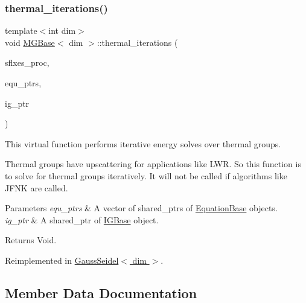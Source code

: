 \subsubsection{\texorpdfstring{thermal\+\_\+iterations()}{thermal\_iterations()}}
{\footnotesize\ttfamily template$<$int dim$>$ \\
void \hyperlink{class_m_g_base}{M\+G\+Base}$<$ dim $>$\+::thermal\+\_\+iterations (\begin{DoxyParamCaption}\item[{std\+::vector$<$ Vector$<$ double $>$ $>$ \&}]{sflxes\+\_\+proc,  }\item[{std\+::vector$<$ std\+\_\+cxx11\+::shared\+\_\+ptr$<$ \hyperlink{class_equation_base}{Equation\+Base}$<$ dim $>$ $>$ $>$ \&}]{equ\+\_\+ptrs,  }\item[{std\+\_\+cxx11\+::shared\+\_\+ptr$<$ \hyperlink{class_i_g_base}{I\+G\+Base}$<$ dim $>$ $>$}]{ig\+\_\+ptr }\end{DoxyParamCaption})\hspace{0.3cm}{\ttfamily [virtual]}}

This virtual function performs iterative energy solves over thermal groups.

Thermal groups have upscattering for applications like L\+WR. So this function is to solve for thermal groups iteratively. It will not be called if algorithms like J\+F\+NK are called.


\begin{DoxyParams}{Parameters}
{\em equ\+\_\+ptrs} & A vector of shared\+\_\+ptr\textquotesingle{}s of \hyperlink{class_equation_base}{Equation\+Base} objects. \\
\hline
{\em ig\+\_\+ptr} & A shared\+\_\+ptr of \hyperlink{class_i_g_base}{I\+G\+Base} object. \\
\hline
\end{DoxyParams}
\begin{DoxyReturn}{Returns}
Void. 
\end{DoxyReturn}


Reimplemented in \hyperlink{class_gauss_seidel_a8db6abbdc88413cbf502ac606b415733}{Gauss\+Seidel$<$ dim $>$}.



\subsection{Member Data Documentation}
\mbox{\label{class_m_g_base_af50b1bdc92270c342524eacfc644170c}} 
